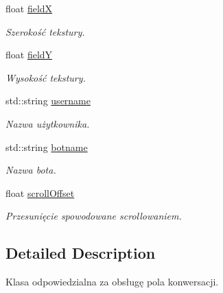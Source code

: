 \begin{DoxyCompactItemize}
\mbox{\label{class_conversation_field_ac648969d6558c7a70ff96de5ea6a3a29}} 
float \mbox{\hyperlink{class_conversation_field_ac648969d6558c7a70ff96de5ea6a3a29}{fieldX}}
\begin{DoxyCompactList}\small\item\em Szerokość tekstury. \end{DoxyCompactList}\item 
\mbox{\label{class_conversation_field_ad2c2b91934444d1422bebb5c21e1c51d}} 
float \mbox{\hyperlink{class_conversation_field_ad2c2b91934444d1422bebb5c21e1c51d}{fieldY}}
\begin{DoxyCompactList}\small\item\em Wysokość tekstury. \end{DoxyCompactList}\item 
\mbox{\label{class_conversation_field_ac83f8ff2b1715a8cb1ae3e3373b1615c}} 
std\+::string \mbox{\hyperlink{class_conversation_field_ac83f8ff2b1715a8cb1ae3e3373b1615c}{username}}
\begin{DoxyCompactList}\small\item\em Nazwa użytkownika. \end{DoxyCompactList}\item 
\mbox{\label{class_conversation_field_a3e012205623a28b86f1a9caf4f14a2eb}} 
std\+::string \mbox{\hyperlink{class_conversation_field_a3e012205623a28b86f1a9caf4f14a2eb}{botname}}
\begin{DoxyCompactList}\small\item\em Nazwa bota. \end{DoxyCompactList}\item 
\mbox{\label{class_conversation_field_aa280b82099e4ba6326cb2a9aced39a2d}} 
float \mbox{\hyperlink{class_conversation_field_aa280b82099e4ba6326cb2a9aced39a2d}{scroll\+Offset}}
\begin{DoxyCompactList}\small\item\em Przesunięcie spowodowane scrollowaniem. \end{DoxyCompactList}\end{DoxyCompactItemize}


\subsection{Detailed Description}
Klasa odpowiedzialna za obsługę pola konwersacji. 

